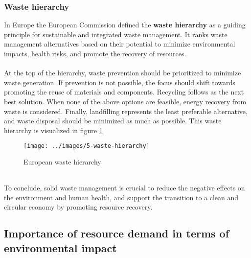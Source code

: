 \documentclass[../summary.tex]{subfiles}
\begin{document}
	\subsubsection{Waste hierarchy}
	
	In Europe the European Commission defined the \textbf{waste hierarchy} as a guiding principle for sustainable and integrated waste management. It ranks waste management alternatives based on their potential to minimize environmental impacts, health risks, and promote the recovery of resources. \\
	\\
	At the top of the hierarchy, waste prevention should be prioritized to minimize waste generation. If prevention is not possible, the focus should shift towards promoting the reuse of materials and components. Recycling follows as the next best solution. When none of the above options are feasible, energy recovery from waste is considered. Finally, landfilling represents the least preferable alternative, and waste disposal should be minimized as much as possible. This waste hierarchy is visualized in figure \ref{fig:5-waste-hierarchy}
	
	\begin{figure}[H]
		\centering
		\texttt{[image: ../images/5-waste-hierarchy]}
		\caption{European waste hierarchy}
		\label{fig:5-waste-hierarchy}
	\end{figure}
	
	\ \\
	To conclude, solid waste management is crucial to reduce the negative effects on the environment and human health, and support the transition to a clean and circular economy by promoting resource recovery.  
	\newpage
	
	\subsection{Importance of resource demand in terms of environmental impact}
	
\end{document}
